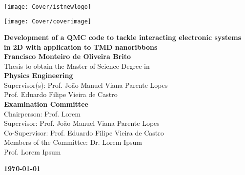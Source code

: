 \setcounter{page}{1} 


\thispagestyle{empty}

\begin{flushleft} ~\\ \vspace{-12mm} \hspace{-12mm}
\texttt{[image: Cover/istnewlogo]}
\vspace{10mm}
\\ \begin{center} \texttt{[image: Cover/coverimage]}  \end{center} %
 \vspace{5mm}
\centering
\LARGE \textbf{Development of a QMC code to tackle interacting electronic systems in 2D with application to TMD nanoribbons}
\\
\vspace{15mm}
\Large \textbf{Francisco Monteiro de Oliveira Brito} \\
\vspace{12mm}
\large Thesis to obtain the Master of Science Degree in
\\ \vspace{2mm}
\LARGE \textbf{Physics Engineering}
\\ \vspace{10mm}
\large Supervisor(s): Prof. João Manuel Viana Parente Lopes  \\
\large Prof. Eduardo Filipe Vieira de Castro
\\ \vspace{15mm}
\Large \textbf{Examination Committee}
\\ \vspace{5mm}
\large Chairperson:	Prof. Lorem \\
\large Supervisor: Prof. João Manuel Viana Parente Lopes\\
\large Co-Supervisor: Prof. Eduardo Filipe Vieira de Castro \\
\large Members of the Committee: Dr. Lorem Ipsum \\
Prof. Lorem Ipsum
 
\vspace{15mm}

\Large \textbf{\todaythesis\today} \\
\let\thepage\relax
\end{flushleft}
\pagebreak


\clearpage

\thispagestyle{empty}
\cleardoublepage

\setcounter{page}{1} 

\baselineskip 18pt %
